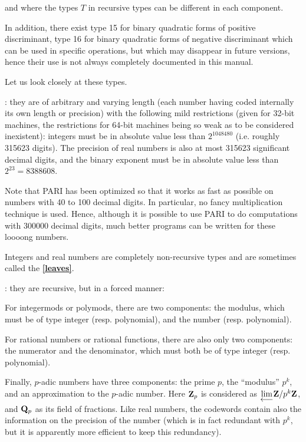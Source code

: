 and where the types $T$ in recursive types can be different in each component.

In addition, there exist type 15 for binary quadratic forms of positive
discriminant, type 16 for binary quadratic forms of negative discriminant
which can be used in specific operations, but which may disappear in future
versions, hence their use is not always completely documented in this manual.

Let us look closely at these types.

:
they are of arbitrary and varying length
(each number having coded
internally its own length or precision) with the following mild restrictions
(given for 32-bit machines, the restrictions for 64-bit machines being so
weak as to be considered inexistent): integers must be in absolute value less
than $2^{1048480}$ (i.e. roughly 315623 digits).
The precision of real numbers is also at most 315623 significant decimal
digits, and the
binary exponent must be in absolute value less than $2^{23}=8388608$.

Note that PARI has been optimized so that it works as fast as possible on
numbers with
40 to 100 decimal digits. In particular, no fancy multiplication technique is
used.
Hence, although it is possible to use PARI to do computations with 300000
decimal digits, much better programs can be written for these loooong numbers.

Integers and real numbers are completely non-recursive types and are sometimes
called the {\bf \ref{leaves}}.

:
 they are recursive, but in a forced manner:

For integermods or polymods, there are two components: the modulus, which
must be of type integer (resp. polynomial), and the number (resp. polynomial).

For rational numbers or rational functions, there are also only two
components: the numerator
and the denominator, which must both be of type integer (resp. polynomial).

Finally, $p$-adic numbers have three components: the prime $p$, the
``modulus'' $p^k$,
and an approximation to the $p$-adic number. Here $\Bbb Z_p$ is considered as
$\varprojlim \Bbb Z/p^k\Bbb Z$, and $\Bbb Q_p$ as its field of fractions.
Like real numbers, the codewords contain also the information on the
precision
of the number (which is in fact redundant with $p^k$, but it is apparently more
efficient to keep this redundancy).

